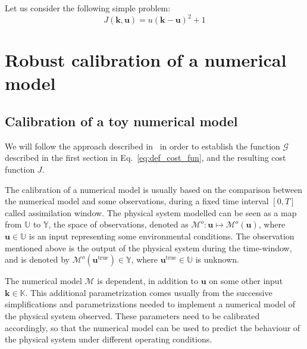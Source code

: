 \documentclass[preprint, 1p]{elsarticle}
\newcommand{\Kspace}{\mathbb{K}}
\newcommand{\Uspace}{\mathbb{U}}
\begin{document}
Let us consider the following simple problem:
\begin{equation}
  \label{eq:Jinfinite}
  J(\mathbf{k},\mathbf{u}) = u(\mathbf{k}-\mathbf{u})^2 + 1
\end{equation}


\clearpage

\section{Robust calibration of a numerical model}
\label{sec:SWE_application}

\subsection{Calibration of a toy numerical model}
 We will follow the approach described in~\cite{kennedy_bayesian_2001} in order to establish the function $\mathcal{G}$ described in the first section in Eq.~\eqref{eq:def_cost_fun}, and the resulting cost function $J$.
 
 The calibration of a numerical model is usually based on the comparison between the numerical model and some observations, during a fixed time interval $[0, T]$ called assimilation window.
 The physical system modelled can be seen as a map from $\Uspace$ to $\mathbb{Y}$, the space of observations, denoted as $\mathcal{M}^o : \mathbf{u}\mapsto \mathcal{M}^o(\mathbf{u})$, where $\mathbf{u}\in\Uspace$ is an input representing some environmental conditions. The observation mentioned above is the output of the physical system during the time-window, and is denoted by $\mathcal{M}^o(\mathbf{u}^{\mathrm{true}}) \in \mathbb{Y}$, where $\mathbf{u}^{\mathrm{true}} \in \Uspace$ is unknown.

 
The numerical model $\mathcal{M}$ is dependent, in addition to $\mathbf{u}$ on some other input $\mathbf{k}\in\Kspace$. This additional parametrization comes usually from the successive simplifications and parametrizations needed to implement a numerical model of the physical system observed. These parameters need to be calibrated accordingly, so that the numerical model can be used to predict the behaviour of the physical system under different operating conditions.
\end{document}
